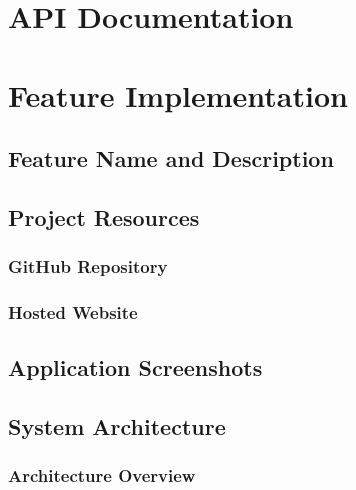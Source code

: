 \documentclass[12pt, a4paper]{report}
\begin{document}
\chapter{API Documentation}
\chapter{Feature Implementation}

\section{Feature Name and Description}

\section{Project Resources}
\subsection{GitHub Repository}

\subsection{Hosted Website}

\section{Application Screenshots}

\section{System Architecture}
\subsection{Architecture Overview}
\end{document}
